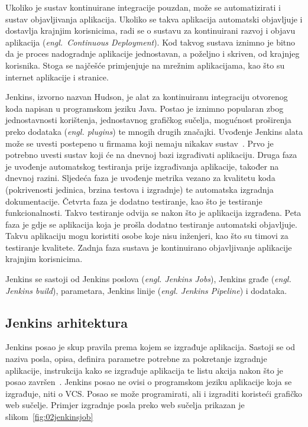 Ukoliko je sustav kontinuirane integracije pouzdan, može se automatizirati i sustav objavljivanja
aplikacija. Ukoliko se takva aplikacija automatski objavljuje i dostavlja krajnjim korisnicima, radi
se o sustavu za kontinuirani razvoj i objavu aplikacija (\textit{engl.~Continuous Deployment}). Kod
takvog sustava iznimno je bitno da je proces nadogradnje aplikacije jednostavan, a poželjno i
skriven, od krajnjeg korisnika. Stoga se najčešće primjenjuje na mrežnim aplikacijama, kao što su
internet aplikacije i stranice.

Jenkins, izvorno nazvan Hudson, je alat za kontinuiranu integraciju otvorenog koda napisan u
programskom jeziku Java. Postao je iznimno popularan zbog jednostavnosti korištenja, jednostavnog
grafičkog sučelja, mogućnost proširenja preko dodataka (\textit{engl. plugins}) te mnogih drugih
značajki. Uvođenje Jenkins alata može se uvesti postepeno u firmama koji nemaju nikakav
sustav~\citep{smart2011jenkins}. Prvo je potrebno uvesti sustav koji će na dnevnoj bazi izgrađivati
aplikaciju. Druga faza je uvođenje automatskog testiranja prije izgrađivanja aplikacije, također na
dnevnoj razini. Sljedeća faza je uvođenje metrika vezano za kvalitetu koda (pokrivenosti jedinica,
brzina testova i izgradnje) te automatska izgradnja dokumentacije. Četvrta faza je dodatno
testiranje, kao što je testiranje funkcionalnosti. Takvo testiranje odvija se nakon što je
aplikacija izgrađena. Peta faza je gdje se aplikacija koja je prošla dodatno testiranje automatski
objavljuje. Takvu aplikaciju mogu koristiti osobe koje nisu inženjeri, kao što su timovi za
testiranje kvalitete. Zadnja faza sustava je kontinuirano objavljivanje aplikacije krajnjim
korisnicima.

Jenkins se sastoji od Jenkins poslova (\textit{engl. Jenkins Jobs}), Jenkins građe (\textit{engl.
Jenkins build}), parametara, Jenkins linije (\textit{engl. Jenkins Pipeline}) i dodataka.

\subsection{Jenkins arhitektura}
Jenkins posao je skup pravila prema kojem se izgrađuje aplikacija. Sastoji se od naziva posla,
opisa, definira parametre potrebne za pokretanje izgradnje aplikacije, instrukcija kako se izgrađuje
aplikacija te listu akcija nakon što je posao završen~\citep{pathania2016learning}. Jenkins posao ne
ovisi o programskom jeziku aplikacije koja se izgrađuje, niti o VCS. Posao se može programirati, ali
i izgraditi koristeći grafičko web sučelje. Primjer izgradnje posla preko web sučelja prikazan je
slikom~\ref{fig:02jenkinsjob}

